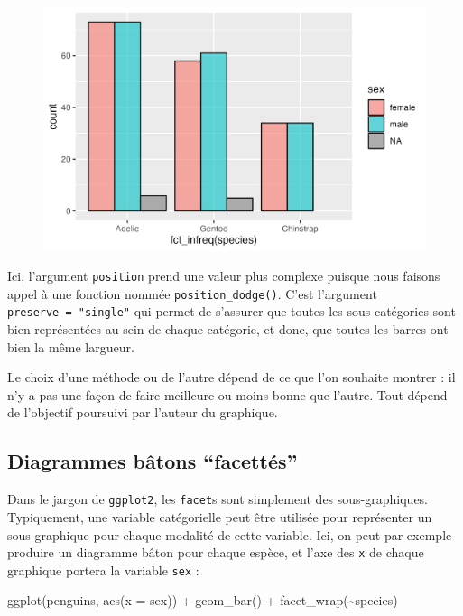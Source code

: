 \documentclass[
  letterpaper,
  DIV=11,
  numbers=noendperiod]{scrreprt}
\newenvironment{Shaded}{\begin{snugshade}}{\end{snugshade}}
\newcommand{\AttributeTok}[1]{\textcolor[rgb]{0.40,0.45,0.13}{#1}}
\newcommand{\FunctionTok}[1]{\textcolor[rgb]{0.28,0.35,0.67}{#1}}
\newcommand{\NormalTok}[1]{\textcolor[rgb]{0.00,0.23,0.31}{#1}}
\newcommand{\SpecialCharTok}[1]{\textcolor[rgb]{0.37,0.37,0.37}{#1}}
\begin{document}
\begin{figure}[H]

{\centering \includegraphics{./03-visualization_files/figure-pdf/unnamed-chunk-60-1.png}

}

\end{figure}

Ici, l'argument \texttt{position} prend une valeur plus complexe puisque
nous faisons appel à une fonction nommée \texttt{position\_dodge()}.
C'est l'argument \texttt{preserve\ =\ "single"} qui permet de s'assurer
que toutes les sous-catégories sont bien représentées au sein de chaque
catégorie, et donc, que toutes les barres ont bien la même largueur.

Le choix d'une méthode ou de l'autre dépend de ce que l'on souhaite
montrer : il n'y a pas une façon de faire meilleure ou moins bonne que
l'autre. Tout dépend de l'objectif poursuivi par l'auteur du graphique.

\hypertarget{diagrammes-buxe2tons-facettuxe9s}{%
\subsection{Diagrammes bâtons
``facettés''}\label{diagrammes-buxe2tons-facettuxe9s}}

Dans le jargon de \texttt{ggplot2}, les \texttt{facet}s sont simplement
des sous-graphiques. Typiquement, une variable catégorielle peut être
utilisée pour représenter un sous-graphique pour chaque modalité de
cette variable. Ici, on peut par exemple produire un diagramme bâton
pour chaque espèce, et l'axe des \texttt{x} de chaque graphique portera
la variable \texttt{sex} :

\begin{Shaded}
\begin{Highlighting}[]
\FunctionTok{ggplot}\NormalTok{(penguins, }\FunctionTok{aes}\NormalTok{(}\AttributeTok{x =}\NormalTok{ sex)) }\SpecialCharTok{+}
  \FunctionTok{geom\_bar}\NormalTok{() }\SpecialCharTok{+}
  \FunctionTok{facet\_wrap}\NormalTok{(}\SpecialCharTok{\textasciitilde{}}\NormalTok{species)}
\end{Highlighting}
\end{Shaded}
\end{document}
